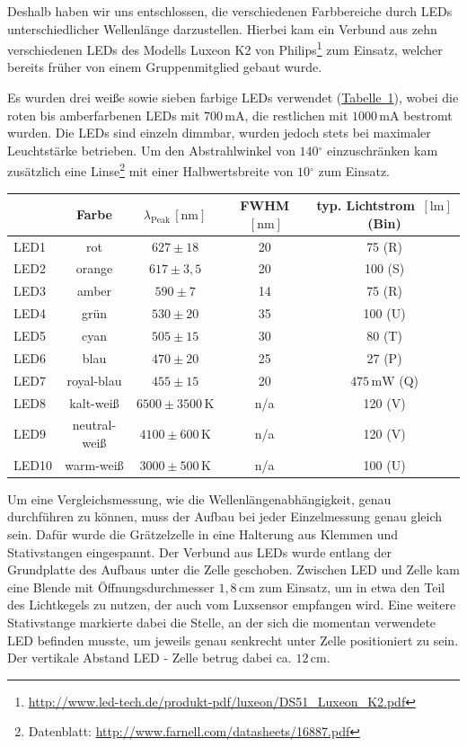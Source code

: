 \documentclass[11pt]{scrartcl}
\newcommand{\unit}[1]{\ensuremath{\,\mathrm{#1}}} %
\newcommand{\degr}{\ensuremath{^\circ}}
\begin{document}
Deshalb haben wir uns entschlossen, die verschiedenen Farbbereiche durch LEDs unterschiedlicher Wellenl\"ange darzustellen. Hierbei kam ein Verbund aus zehn verschiedenen LEDs des Modells Luxeon K2 von Philips\footnote{\url{http://www.led-tech.de/produkt-pdf/luxeon/DS51\_Luxeon\_K2.pdf}} zum Einsatz, welcher bereits fr\"uher von einem Gruppenmitglied gebaut wurde.

Es wurden drei weiße sowie sieben farbige LEDs verwendet (\hyperref[leds]{Tabelle~\ref{leds}}), wobei die roten bis amberfarbenen LEDs mit $700 \unit{mA}$, die restlichen mit $1000 \unit{mA}$ bestromt wurden. Die LEDs sind einzeln dimmbar, wurden jedoch stets bei maximaler Leuchtst\"arke betrieben. Um den Abstrahlwinkel von $140\degr$ einzuschränken kam zusätzlich eine Linse\footnote{Datenblatt: \url{http://www.farnell.com/datasheets/16887.pdf}} mit einer Halbwertsbreite von $10\degr$ zum Einsatz.

\begin{table}[ht]
\label{leds}
\begin{center}\vspace{-\baselineskip}
\begin{tabular}{l|cccc}
&Farbe &
$\lambda_{\text{Peak}} \unit{[nm]}$ &
FWHM $\unit{[nm]}$ &
typ. Lichtstrom $\unit{[lm]}$ (Bin)\\
\hline
LED1 & rot		& $627 \pm 18$		& 20	& 75 (R)	\\
LED2 & orange		& $617 \pm 3,5$		& 20	& 100 (S)	\\
LED3 & amber		& $590 \pm 7$		& 14	& 75 (R)	\\
LED4 & grün		& $530 \pm 20$		& 35	& 100 (U)	\\
LED5 & cyan		& $505 \pm 15$		& 30	& 80 (T)	\\
LED6 & blau		& $470 \pm 20$		& 25	& 27 (P)	\\
LED7 & royal-blau	& $455 \pm 15$		& 20	& $475 \unit{mW}$ (Q)\\
LED8 & kalt-weiß	& $6500\pm 3500\unit{K}$& n/a	& 120 (V)	\\
LED9 & neutral-weiß	& $4100\pm 600 \unit{K}$& n/a	& 120 (V)	\\
LED10 & warm-weiß	& $3000\pm 500 \unit{K}$& n/a	& 100 (U)	
\end{tabular}
\vspace{-\baselineskip}\end{center}
\end{table}


Um eine Vergleichsmessung, wie die Wellenl\"angenabh\"angigkeit, genau durchf\"uhren zu k\"onnen, muss der Aufbau bei jeder Einzelmessung genau gleich sein. Daf\"ur wurde die Gr\"atzelzelle in eine Halterung aus Klemmen und Stativstangen eingespannt. Der Verbund aus LEDs wurde entlang der Grundplatte des Aufbaus unter die Zelle geschoben. Zwischen LED und Zelle kam eine Blende mit \"Offnungsdurchmesser $1,8\unit{cm}$ zum Einsatz, um in etwa den Teil des Lichtkegels zu nutzen, der auch vom Luxsensor empfangen wird. Eine weitere Stativstange markierte dabei die Stelle, an der sich die momentan verwendete LED befinden musste, um jeweils genau senkrecht unter Zelle positioniert zu sein. Der vertikale Abstand LED - Zelle betrug dabei ca. $12\unit{cm}$.
\end{document}
